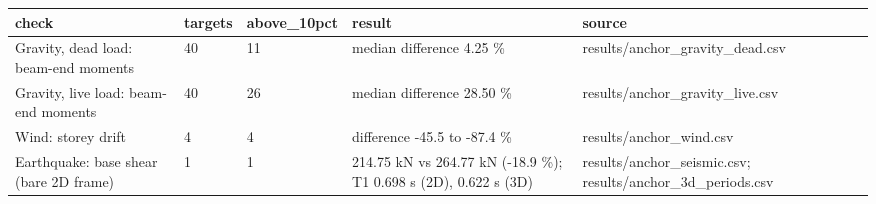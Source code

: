 \begin{tabular}{lllll}
\toprule
check & targets & above\_10pct & result & source \\
\midrule
Gravity, dead load: beam-end moments & 40 & 11 & median \textbar{}difference\textbar{} 4.25 \% & results/anchor\_gravity\_dead.csv \\
Gravity, live load: beam-end moments & 40 & 26 & median \textbar{}difference\textbar{} 28.50 \% & results/anchor\_gravity\_live.csv \\
Wind: storey drift & 4 & 4 & difference -45.5 to -87.4 \% & results/anchor\_wind.csv \\
Earthquake: base shear (bare 2D frame) & 1 & 1 & 214.75 kN vs 264.77 kN (-18.9 \%); T1 0.698 s (2D), 0.622 s (3D) & results/anchor\_seismic.csv; results/anchor\_3d\_periods.csv \\
\bottomrule
\end{tabular}
